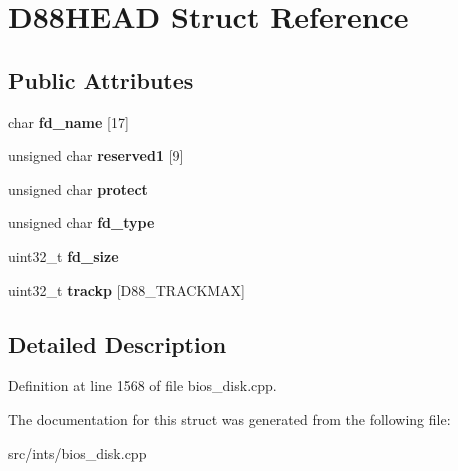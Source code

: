 \hypertarget{structD88HEAD}{\section{D88\-H\-E\-A\-D Struct Reference}
\label{structD88HEAD}
}
\subsection*{Public Attributes}
\begin{DoxyCompactItemize}
\item 
\hypertarget{structD88HEAD_a2c0d333ef195411bba5037f50fd84851}{char {\bfseries fd\-\_\-name} \mbox{[}17\mbox{]}}\label{structD88HEAD_a2c0d333ef195411bba5037f50fd84851}

\item 
\hypertarget{structD88HEAD_a84361ff288bb15c2b0d6f0178ac92307}{unsigned char {\bfseries reserved1} \mbox{[}9\mbox{]}}\label{structD88HEAD_a84361ff288bb15c2b0d6f0178ac92307}

\item 
\hypertarget{structD88HEAD_ae3bd557d9f3ea266a37e5d8e35808169}{unsigned char {\bfseries protect}}\label{structD88HEAD_ae3bd557d9f3ea266a37e5d8e35808169}

\item 
\hypertarget{structD88HEAD_a1d70d36b2a1c7de70b2ea326c60bcbb0}{unsigned char {\bfseries fd\-\_\-type}}\label{structD88HEAD_a1d70d36b2a1c7de70b2ea326c60bcbb0}

\item 
\hypertarget{structD88HEAD_a482cd78a7bd79559ba4982fb5bdadf4e}{uint32\-\_\-t {\bfseries fd\-\_\-size}}\label{structD88HEAD_a482cd78a7bd79559ba4982fb5bdadf4e}

\item 
\hypertarget{structD88HEAD_a7cc91cbeb7f776053cb525dccc7c8abe}{uint32\-\_\-t {\bfseries trackp} \mbox{[}D88\-\_\-\-T\-R\-A\-C\-K\-M\-A\-X\mbox{]}}\label{structD88HEAD_a7cc91cbeb7f776053cb525dccc7c8abe}

\end{DoxyCompactItemize}


\subsection{Detailed Description}


Definition at line 1568 of file bios\-\_\-disk.\-cpp.



The documentation for this struct was generated from the following file\-:\begin{DoxyCompactItemize}
\item 
src/ints/bios\-\_\-disk.\-cpp\end{DoxyCompactItemize}
